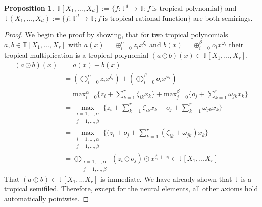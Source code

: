\documentclass{article}
\theoremstyle{definition}
\newtheorem{proposition}[theorem]{Proposition}
\begin{document}
\begin{proposition}
$\mathbb{T}[X_1, \dots , X_d] := \{ f: \mathbb{T}^{d} \to \mathbb{T} ; f \ \text{is tropical polynomial} \}$ and \ $ \mathbb{T}(X_1, \dots , X_d) := \{ f: \mathbb{T}^{d} \to \mathbb{T} ; f \ \text{is tropical rational function} \}$ are both semirings. \cite[p.~3]{zhang2018tropical}
\end{proposition}
\begin{proof}
We begin the proof by showing, that for two tropical polynomials $a, b \in \mathbb{T}[X_1, \dots , X_r]$ with $a(x) =\oplus_{i=0}^{\alpha} z_{i} x^{\zeta_{i}}$ and $b(x)= \oplus_{i=0}^{\beta} o_{i} x^{\omega_{i}}$ their tropical multiplication is a tropical polynomial $(a \odot b)(x) \in \mathbb{T}[X_1, \dots , X_r]$.
\begin{align*} 
(a \odot b)(x) &= a(x) + b(x) \\
&=  (\bigoplus_{i=0}^{\alpha} z_{i} x^{\zeta_{i}}) + (\bigoplus_{i=0}^{\beta} o_{i} x^{\omega_{i}}) \\
&= \text{max}_{i=0}^{\alpha} \{ z_{i} + \sum_{k=1}^{r} \zeta_{ik} x_{k} \} + \text{max}_{j=0}^{\beta} \{ o_{j} + \sum_{k=1}^{r} \omega_{jk} x_{k} \} \\
&= \max_{\substack{
   i=1, \dots , \alpha \\
   j=1, \dots , \beta
  }} \{ z_{i} + \sum_{k=1}^{r} \zeta_{ik} x_{k} + o_{j} + \sum_{k=1}^{r} \omega_{jk} x_{k} \} \\
&= \max_{\substack{
   i=1, \dots , \alpha \\
   j=1, \dots , \beta
  }} \{ (z_{i} + o_{j} + \sum_{k=1}^{r} (\zeta_{ik} + \omega_{jk}) x_{k} \} \\
&= \bigoplus_{\substack{
   i=1, \dots , \alpha \\
   j=1, \dots , \beta
  }} \ (z_{i} \odot o_{j}) \odot x^{\zeta_{i} + \omega_{i}} \in \mathbb{T}[X_1, \dots X_r]
\end{align*}
That $(a \oplus b) \in \mathbb{T}[X_1, \dots X_r]$ is immediate. We have already shown that $\mathbb{T}$ is a tropical semifiled. Therefore, except for the neural elements, all other axioms hold automatically pointwise.


\end{proof}
\end{document}

